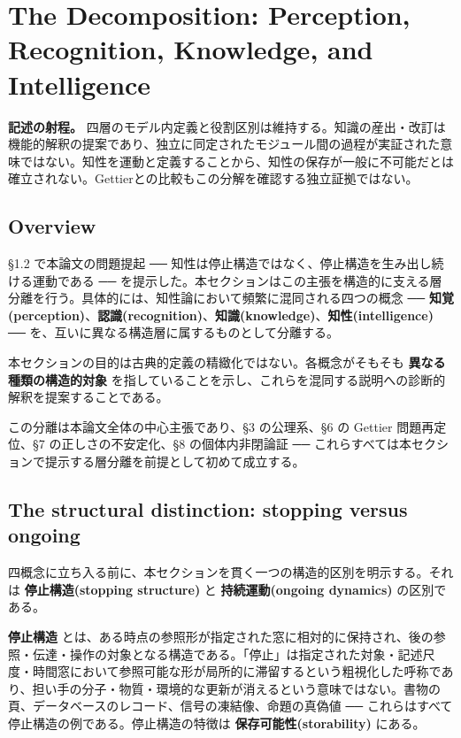 \section{The Decomposition: Perception, Recognition, Knowledge, and Intelligence}

\noindent\textbf{記述の射程。} 四層のモデル内定義と役割区別は維持する。知識の産出・改訂は機能的解釈の提案であり、独立に同定されたモジュール間の過程が実証された意味ではない。知性を運動と定義することから、知性の保存が一般に不可能だとは確立されない。Gettierとの比較もこの分解を確認する独立証拠ではない。



\subsection{Overview}


\S{}1.2 で本論文の問題提起 ── 知性は停止構造ではなく、停止構造を生み出し続ける運動である ── を提示した。本セクションはこの主張を構造的に支える層分離を行う。具体的には、知性論において頻繁に混同される四つの概念 ── \textbf{知覚(perception)}、\textbf{認識(recognition)}、\textbf{知識(knowledge)}、\textbf{知性(intelligence)} ── を、互いに異なる構造層に属するものとして分離する。

本セクションの目的は古典的定義の精緻化ではない。各概念がそもそも \textbf{異なる種類の構造的対象} を指していることを示し、これらを混同する説明への診断的解釈を提案することである。

この分離は本論文全体の中心主張であり、\S{}3 の公理系、\S{}6 の Gettier 問題再定位、\S{}7 の正しさの不安定化、\S{}8 の個体内非閉論証 ── これらすべては本セクションで提示する層分離を前提として初めて成立する。

\subsection{The structural distinction: stopping versus ongoing}


四概念に立ち入る前に、本セクションを貫く一つの構造的区別を明示する。それは \textbf{停止構造(stopping structure)} と \textbf{持続運動(ongoing dynamics)} の区別である。

\textbf{停止構造} とは、ある時点の参照形が指定された窓に相対的に保持され、後の参照・伝達・操作の対象となる構造である。「停止」は指定された対象・記述尺度・時間窓において参照可能な形が局所的に滞留するという粗視化した呼称であり、担い手の分子・物質・環境的な更新が消えるという意味ではない。書物の頁、データベースのレコード、信号の凍結像、命題の真偽値 ── これらはすべて停止構造の例である。停止構造の特徴は \textbf{保存可能性(storability)} にある。

